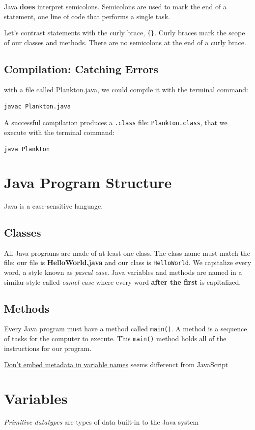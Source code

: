\documentclass[a4paper, 12pt]{article}
\begin{document}
Java \textbf{does} interpret semicolons. Semicolons are used to mark the end of a statement, one line of code that performs a single task.

Let's contrast statements with the curly brace, \verb|{}|. Curly braces mark the scope of our classes and methods. There are no semicolons at the end of a curly brace.

\subsection{Compilation: Catching Errors}
with a file called Plankton.java, we could compile it with the terminal command:

\verb|javac Plankton.java|

A successful compilation produces a \verb|.class| file: \verb|Plankton.class|, that we execute with the terminal command:

\verb|java Plankton|


\section{Java Program Structure}
Java is a case-sensitive language.

\subsection{Classes}
All Java programs are made of at least one class. The class name must match the file: our file is \textbf{HelloWorld.java} and our class is \verb|HelloWorld|. We capitalize every word, a style known as \textit{pascal case}. Java variables and methods are named in a similar style called \textit{camel case} where every word \textbf{after the first} is capitalized.

\subsection{Methods}
Every Java program must have a method called \verb|main()|. A method is a sequence of tasks for the computer to execute. This \verb|main()| method holds all of the instructions for our program.

\href{https://github.com/twitter/commons/blob/master/src/java/com/twitter/common/styleguide.md#dont-embed-metadata-in-variable-names}{Don't embed metadata in variable names} seems differenct from JavaScript


\section{Variables}
\textit{Primitive datatypes} are types of data built-in to the Java system
\end{document}
